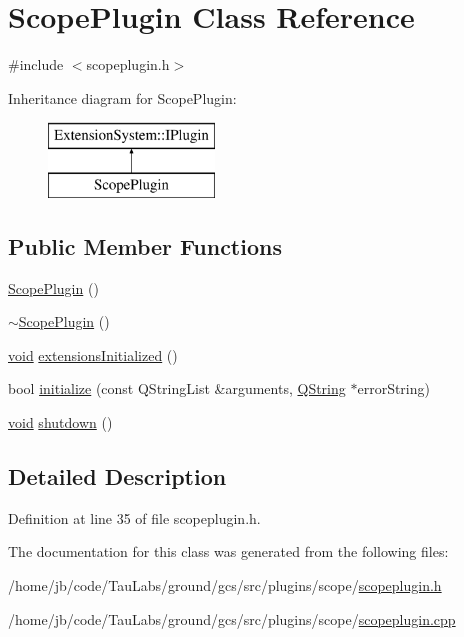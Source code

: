 \hypertarget{class_scope_plugin}{\section{\-Scope\-Plugin \-Class \-Reference}
\label{class_scope_plugin}
}


{\ttfamily \#include $<$scopeplugin.\-h$>$}

\-Inheritance diagram for \-Scope\-Plugin\-:\begin{figure}[H]
\begin{center}
\leavevmode
\includegraphics[height=2.000000cm]{class_scope_plugin}
\end{center}
\end{figure}
\subsection*{\-Public \-Member \-Functions}
\begin{DoxyCompactItemize}
\item 
\hyperlink{group___scope_plugin_ga199bf070e8b30f153774fed25c1bfb85}{\-Scope\-Plugin} ()
\item 
\hyperlink{group___scope_plugin_ga8c6b2fb4f5b848c5462148b93158ae5e}{$\sim$\-Scope\-Plugin} ()
\item 
\hyperlink{group___u_a_v_objects_plugin_ga444cf2ff3f0ecbe028adce838d373f5c}{void} \hyperlink{group___scope_plugin_ga92b5617116c8cbaa97c2f26bb2863ab3}{extensions\-Initialized} ()
\item 
bool \hyperlink{group___scope_plugin_gad49bcc2c25eda45814189ba82b8a1a5b}{initialize} (const \-Q\-String\-List \&arguments, \hyperlink{group___u_a_v_objects_plugin_gab9d252f49c333c94a72f97ce3105a32d}{\-Q\-String} $\ast$error\-String)
\item 
\hyperlink{group___u_a_v_objects_plugin_ga444cf2ff3f0ecbe028adce838d373f5c}{void} \hyperlink{group___scope_plugin_ga13799130d5adbbdc55c06e4597df6a08}{shutdown} ()
\end{DoxyCompactItemize}


\subsection{\-Detailed \-Description}


\-Definition at line 35 of file scopeplugin.\-h.



\-The documentation for this class was generated from the following files\-:\begin{DoxyCompactItemize}
\item 
/home/jb/code/\-Tau\-Labs/ground/gcs/src/plugins/scope/\hyperlink{scopeplugin_8h}{scopeplugin.\-h}\item 
/home/jb/code/\-Tau\-Labs/ground/gcs/src/plugins/scope/\hyperlink{scopeplugin_8cpp}{scopeplugin.\-cpp}\end{DoxyCompactItemize}
